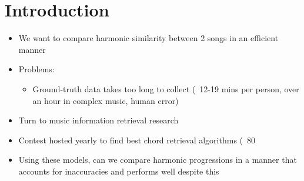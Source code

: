 \section{Introduction}

\begin{itemize}
\item We want to compare harmonic similarity between 2 songs in an efficient manner
\item Problems:
    \begin{itemize}
    \item Ground-truth data takes too long to collect (~12-19 mins per person, over an hour in complex music, human error)
    \end{itemize}
\item Turn to music information retrieval research
\item Contest hosted yearly to find best chord retrieval algorithms (~80%
\item Using these models, can we compare harmonic progressions in a manner that accounts for inaccuracies and performs well despite this
\end{itemize}